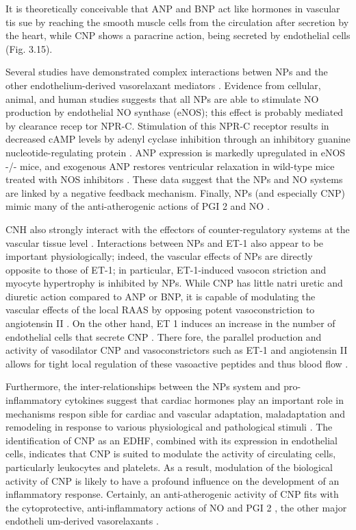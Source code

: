 \documentclass[14pt,a4paper,onecolumn]{extarticle}
\begin{document}
It is theoretically conceivable that ANP and BNP act like hormones in vascular tis sue by reaching the smooth muscle cells from the circulation after secretion by the heart, while CNP shows a paracrine action, being secreted by endothelial cells \citep{57} \citep{87} \citep{88} (Fig. 3.15).



Several studies have demonstrated complex interactions betwen NPs and the other endothelium-derived vasorelaxant mediators \citep{267}. Evidence from cellular, animal, and human studies suggests that all NPs are able to stimulate NO production by endothelial NO synthase (eNOS); this effect is probably mediated by clearance recep tor NPR-C. Stimulation of this NPR-C receptor results in decreased cAMP levels by adenyl cyclase inhibition through an inhibitory guanine nucleotide-regulating protein \citep{270}. ANP expression is markedly upregulated in eNOS -/- mice, and exogenous ANP restores ventricular relaxation in wild-type mice treated with NOS inhibitors \citep{118}. These data suggest that the NPs and NO systems are linked by a negative feedback mechanism. Finally, NPs (and especially CNP) mimic many of the anti-atherogenic actions of PGI 2 and NO \citep{267}.



CNH also strongly interact with the effectors of counter-regulatory systems at the vascular tissue level \citep{13} \citep{28} \citep{77} \citep{bib33} \citep{97} \citep{98} \citep{99}. Interactions between NPs and ET-1 also appear to be important physiologically; indeed, the vascular effects of NPs are directly opposite to those of ET-1; in particular, ET-1-induced vasocon striction and myocyte hypertrophy is inhibited by NPs. While CNP has little natri uretic and diuretic action compared to ANP or BNP, it is capable of modulating the vascular effects of the local RAAS by opposing potent vasoconstriction to angiotensin II \citep{269}. On the other hand, ET 1 induces an increase in the number of endothelial cells that secrete CNP \citep{279}. There fore, the parallel production and activity of vasodilator CNP and vasoconstrictors such as ET-1 and angiotensin II allows for tight local regulation of these vasoactive peptides and thus blood flow \citep{267} \citep{269} \citep{279}.



Furthermore, the inter-relationships between the NPs system and pro-inflammatory cytokines suggest that cardiac hormones play an important role in mechanisms respon sible for cardiac and vascular adaptation, maladaptation and remodeling in response to various physiological and pathological stimuli \citep{32} \citep{35}. The identification of CNP as an EDHF, combined with its expression in endothelial cells, indicates that CNP is suited to modulate the activity of circulating cells, particularly leukocytes and platelets.  As a result, modulation of the biological activity of CNP is likely to have a profound influence on the development of an inflammatory response. Certainly, an anti-atherogenic activity of CNP fits with the cytoprotective, anti-inflammatory actions of NO and PGI 2 , the other major endotheli um-derived vasorelaxants \citep{267} \citep{269} \citep{270} \citep{271}.
\end{document}
